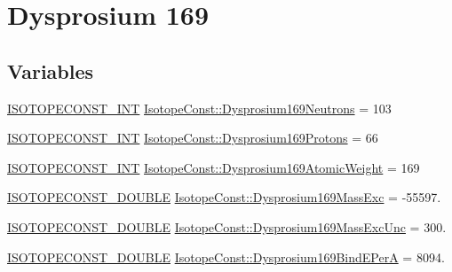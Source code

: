 \hypertarget{group___isotope_const-_dysprosium-_dy169}{}\section{Dysprosium 169}
\label{group___isotope_const-_dysprosium-_dy169}
\subsection*{Variables}
\begin{DoxyCompactItemize}
\item 
\mbox{\hyperlink{group___isotope_const-_macros_ga5f18360b3e99483a35c32d789e62621c}{I\+S\+O\+T\+O\+P\+E\+C\+O\+N\+S\+T\+\_\+\+I\+NT}} \mbox{\hyperlink{group___isotope_const-_dysprosium-_dy169_gafff8ed7eaf37068c6326b2730446b3ab}{Isotope\+Const\+::\+Dysprosium169\+Neutrons}} = 103
\item 
\mbox{\hyperlink{group___isotope_const-_macros_ga5f18360b3e99483a35c32d789e62621c}{I\+S\+O\+T\+O\+P\+E\+C\+O\+N\+S\+T\+\_\+\+I\+NT}} \mbox{\hyperlink{group___isotope_const-_dysprosium-_dy169_ga75f373f6f78e59dba1ba29961d4af159}{Isotope\+Const\+::\+Dysprosium169\+Protons}} = 66
\item 
\mbox{\hyperlink{group___isotope_const-_macros_ga5f18360b3e99483a35c32d789e62621c}{I\+S\+O\+T\+O\+P\+E\+C\+O\+N\+S\+T\+\_\+\+I\+NT}} \mbox{\hyperlink{group___isotope_const-_dysprosium-_dy169_gaa04accb497e8664846e55590d9aad27e}{Isotope\+Const\+::\+Dysprosium169\+Atomic\+Weight}} = 169
\item 
\mbox{\hyperlink{group___isotope_const-_macros_ga8f45a7272ce02c0b4c65c44636ed719a}{I\+S\+O\+T\+O\+P\+E\+C\+O\+N\+S\+T\+\_\+\+D\+O\+U\+B\+LE}} \mbox{\hyperlink{group___isotope_const-_dysprosium-_dy169_ga4cdfec54547b7e6d3a04ac37904ce501}{Isotope\+Const\+::\+Dysprosium169\+Mass\+Exc}} = -\/55597.
\item 
\mbox{\hyperlink{group___isotope_const-_macros_ga8f45a7272ce02c0b4c65c44636ed719a}{I\+S\+O\+T\+O\+P\+E\+C\+O\+N\+S\+T\+\_\+\+D\+O\+U\+B\+LE}} \mbox{\hyperlink{group___isotope_const-_dysprosium-_dy169_ga2354b275ed83708cb0cc57441b241ae7}{Isotope\+Const\+::\+Dysprosium169\+Mass\+Exc\+Unc}} = 300.
\item 
\mbox{\hyperlink{group___isotope_const-_macros_ga8f45a7272ce02c0b4c65c44636ed719a}{I\+S\+O\+T\+O\+P\+E\+C\+O\+N\+S\+T\+\_\+\+D\+O\+U\+B\+LE}} \mbox{\hyperlink{group___isotope_const-_dysprosium-_dy169_gaa58b06f6c579939ea8e97967e1cba169}{Isotope\+Const\+::\+Dysprosium169\+Bind\+E\+PerA}} = 8094.

\end{DoxyCompactItemize}
